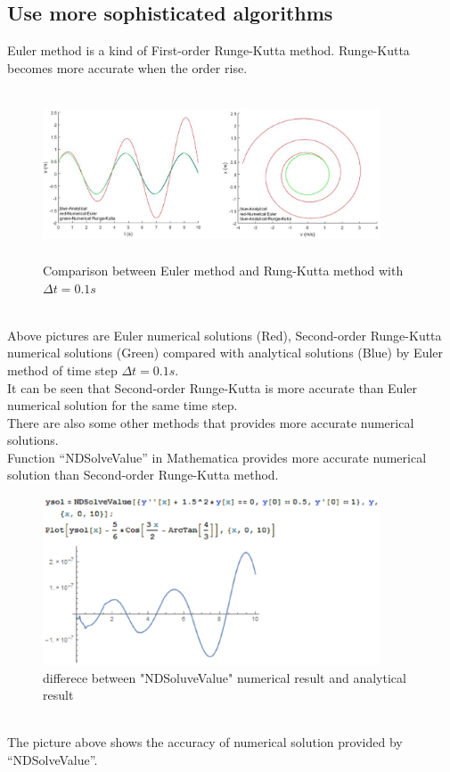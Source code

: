 \documentclass{article}
\begin{document}
\subsection{Use more sophisticated algorithms}
Euler method is a kind of First-order Runge-Kutta method. Runge-Kutta becomes more accurate when the order rise.
\begin{figure}[!htb]
	\begin{center}
		\includegraphics[height=5cm,width=10cm]{Section4_3}
	\end{center}
	\caption{Comparison between Euler method and Rung-Kutta method with $\Delta t=0.1s$}
\end{figure}
\\Above pictures are Euler numerical solutions (Red), Second-order Runge-Kutta numerical solutions (Green) compared with analytical solutions (Blue) by Euler method of time step $\Delta t=0.1s.$
\\It can be seen that Second-order Runge-Kutta is more accurate than Euler numerical solution for the same time step.
\\There are also some other methods that provides more accurate numerical solutions.
\\Function “NDSolveValue” in Mathematica provides more accurate numerical solution than Second-order Runge-Kutta method.
\begin{figure}[!htb]
	\begin{center}
		\includegraphics[height=5cm,width=10cm]{Section4_4}
	\end{center}
	\caption{differece between "NDSoluveValue" numerical result and analytical result}
\end{figure}
\\The picture above shows the accuracy of numerical solution provided by “NDSolveValue”.
\end{document}

